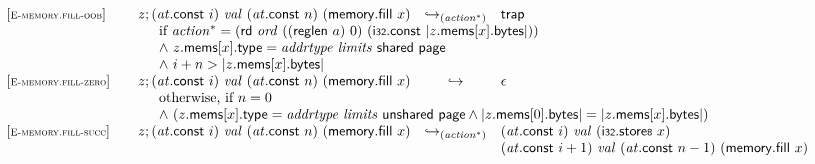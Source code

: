 \vspace{1ex}

$$
\begin{array}[t]{@{}lrcl@{}l@{}}
{[\textsc{\scriptsize E{-}memory.fill{-}oob}]} \quad & z ; ({\mathit{at}}{.}\mathsf{const}~i)~{\mathit{val}}~({\mathit{at}}{.}\mathsf{const}~n)~(\mathsf{memory{.}fill}~x) & {\hookrightarrow}_{({{\mathit{action}}^\ast})} {} & \mathsf{trap} &  \\
& \multicolumn{4}{@{}l@{}}{\quad
\quad
\begin{array}[t]{@{}l@{}}
\mbox{if}~ {{\mathit{action}}^\ast} = (\mathsf{rd}~{\mathit{ord}}~((\mathsf{reglen}~a)~0)~(\mathsf{i{\scriptstyle 32}}{.}\mathsf{const}~{|z{.}\mathsf{mems}{}[x]{.}\mathsf{bytes}|})) \\
{\land}~ z{.}\mathsf{mems}{}[x]{.}\mathsf{type} = {\mathit{addrtype}}~{\mathit{limits}}~\mathsf{shared}~\mathsf{page} \\
{\land}~ i + n > {|z{.}\mathsf{mems}{}[x]{.}\mathsf{bytes}|} \\
\end{array}
} \\
{[\textsc{\scriptsize E{-}memory.fill{-}zero}]} \quad & z ; ({\mathit{at}}{.}\mathsf{const}~i)~{\mathit{val}}~({\mathit{at}}{.}\mathsf{const}~n)~(\mathsf{memory{.}fill}~x) & \hookrightarrow & \epsilon &  \\
& \multicolumn{4}{@{}l@{}}{\quad
\quad
\begin{array}[t]{@{}l@{}}
\mbox{otherwise, if}~ n = 0 \\
{\land}~ (z{.}\mathsf{mems}{}[x]{.}\mathsf{type} = {\mathit{addrtype}}~{\mathit{limits}}~\mathsf{unshared}~\mathsf{page} \land {|z{.}\mathsf{mems}{}[0]{.}\mathsf{bytes}|} = {|z{.}\mathsf{mems}{}[x]{.}\mathsf{bytes}|}) \\
\end{array}
} \\
{[\textsc{\scriptsize E{-}memory.fill{-}succ}]} \quad & z ; ({\mathit{at}}{.}\mathsf{const}~i)~{\mathit{val}}~({\mathit{at}}{.}\mathsf{const}~n)~(\mathsf{memory{.}fill}~x) & {\hookrightarrow}_{({{\mathit{action}}^\ast})} {} & \begin{array}[t]{@{}l@{}} ({\mathit{at}}{.}\mathsf{const}~i)~{\mathit{val}}~({\mathsf{i{\scriptstyle 32}}{.}\mathsf{store}}{\mathsf{{\scriptstyle 8}}}~x) \\
  ({\mathit{at}}{.}\mathsf{const}~i + 1)~{\mathit{val}}~({\mathit{at}}{.}\mathsf{const}~n - 1)~(\mathsf{memory{.}fill}~x) \end{array} &  \\

\end{array}$$
